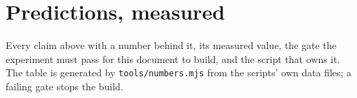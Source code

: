 \section{Predictions, measured}
\label{sec:predictions}

Every claim above with a number behind it, its measured value, the gate the
experiment must pass for this document to build, and the script that owns it.
The table is generated by \texttt{tools/numbers.mjs} from the scripts' own
data files; a failing gate stops the build.

\begin{table}[h]
  \centering\small
  
  \caption{ No claim without a number; no
  number without a script.}
  \label{tab:predictions}
\end{table}

